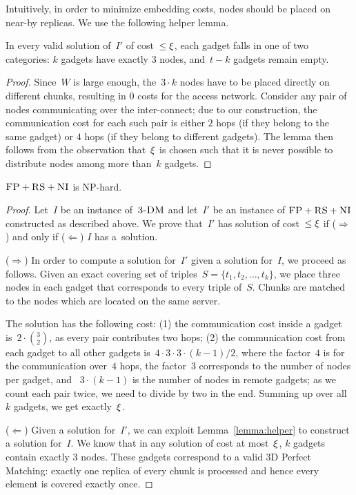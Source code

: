 Intuitively, in order to minimize embedding costs,
nodes should be placed on near-by replicas. We use the following
helper lemma.
\begin{lemma}\label{lemma:helper}
In every valid solution of~$I'$ of cost~$\leq \xi$, each gadget
falls in one of two categories:
$k$ gadgets have exactly
$3$ nodes, and~$t-k$ gadgets remain empty.
\end{lemma}
\begin{proof}
Since~$W$ is large enough, the~$3\cdot k$ nodes have to be placed
directly on different chunks, resulting in 0 costs for the access network.
Consider any pair of nodes
communicating over the
inter-connect; due to our construction, the communication cost
for each such pair is either
$2$ hops (if they belong to the same gadget) or $4$ hops (if they belong
to different gadgets).
The lemma then follows from the observation that~$\xi$
is chosen such that it is never possible to distribute nodes
among more than~$k$ gadgets.
\end{proof}

\begin{theorem}
\label{theorem:fp_rs_cc}
$\textsc{FP}+\textsc{RS}+\textsc{NI}$ is NP-hard.
\end{theorem}
\begin{proof}
Let~$I$ be an instance of~$\textsc{3-DM}$ and let~$I'$ be an instance of
$\textsc{FP}+\textsc{RS}+\textsc{NI}$ constructed as described above.
We prove that~$I'$ has solution of cost~$\leq \xi$ if ($\Rightarrow$) and only if
($\Leftarrow$)
$I$ has a~solution.

($\Rightarrow$) In order to compute a solution
for~$I'$ given a solution for~$I$, we proceed as follows.
Given an exact covering set of triples~$S = \{t_1, t_2,
\ldots, t_k\}$, we place three nodes in each gadget that
corresponds to every triple of~$S$. Chunks are matched to the nodes which are located
on the same server.

The solution has the following cost:
(1) the communication cost inside a gadget is~$2 \cdot {3 \choose 2}$,
  as every pair contributes two hops;
  (2) the communication cost from each gadget to all other gadgets is~$4
  \cdot 3 \cdot 3 \cdot (k - 1) / 2$, where the factor~$4$ is
  for the
  communication over~$4$ hops, the factor~$3$
  corresponds to the number of nodes per gadget, and
 ~$3 \cdot (k-1)$ is the number of nodes in remote gadgets;
  as we count each pair twice, we need to divide by two in the end.
Summing up over all~$k$ gadgets, we get exactly~$\xi$.

($\Leftarrow$) Given a solution for~$I'$,
we can exploit Lemma~\ref{lemma:helper} to construct a solution for~$I$.
We know that in any solution of cost at most~$\xi$,
$k$ gadgets contain exactly 3 nodes. These gadgets correspond to a valid
3D Perfect Matching: exactly one replica of every chunk is processed and
hence every element is covered exactly once.
\end{proof}


